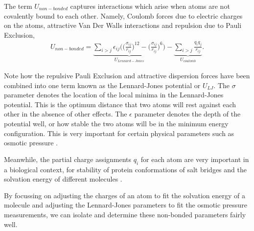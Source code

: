 The term $U_{non-bonded}$ captures interactions which arise when atoms are not covalently bound to each other. Namely, Coulomb forces due to electric charges on the atoms, attractive Van Der Walls interactions and repulsion due to Pauli Exclusion,
\begin{equation}\label{nonbonded_eqs}
	\begin{aligned}
		U_{non-bonded} = \underbrace{\sum_{i>j} \epsilon_{ij} \Big( \Big(\frac{\sigma_{ij}}{r_{ij}}\Big)^{12} - \Big(\frac{\sigma_{ij}}{r_{ij}}\Big)^{6} \Big)}_{U_{Lennard-Jones}} - \underbrace{\sum_{i>j} \frac{q_i q_j } {r_{ij}}}_{U_{coulomb}}. 
	\end{aligned}
\end{equation}

Note how the repulsive Pauli Exclusion and attractive dispersion forces have been combined into one term known as the Lennard-Jones potential or $U_{LJ}$. The $\sigma$ parameter denotes the location of the local minima in the Lennard-Jones potential. This is the optimum distance that two atoms will rest against each other in the absence of other effects. The $\epsilon$ parameter denotes the depth of the potential well, or how stable the two atoms will be in the minimum energy configuration. This is very important for certain physical parameters such as osmotic pressure \cite{yoo2018}.

Meanwhile, the partial charge assignments $q_i$ for each atom are very important in a biological context, for stability of protein conformations of salt bridges and the solvation energy of different molecules \cite{jambeck2013}.

By focussing on adjusting the charges of an atom to fit the solvation energy of a molecule and adjusting the Lennard-Jones parameters to fit the osmotic pressure measurements, we  can isolate and determine these non-bonded parameters fairly well.

